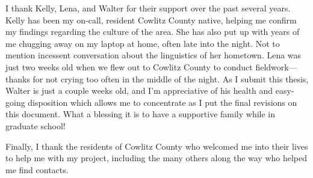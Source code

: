 I thank Kelly, Lena, and Walter for their support over the past several years. Kelly has been my on-call, resident Cowlitz County native, helping me confirm my findings regarding the culture of the area. She has also put up with years of me chugging away on my laptop at home, often late into the night. Not to mention incessent conversation about the linguistics of her hometown. Lena was just two weeks old when we flew out to Cowlitz County to conduct fieldwork---thanks for not crying too often in the middle of the night. As I submit this thesis, Walter is just a couple weeks old, and I'm appreciative of his health and easy-going disposition which allows me to concentrate as I put the final revisions on this document. What a blessing it is to have a supportive family while in graduate school!

Finally, I thank the residents of Cowlitz County who welcomed me into their lives to help me with my project, including the many others along the way who helped me find contacts.
